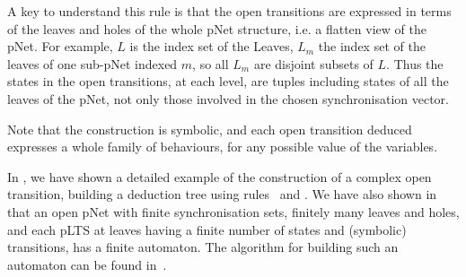 \documentclass{elsarticle}
\newcommand{\TODO}[1]{\textcolor{red}{\textbf{[TODO:#1]}}}
\begin{document}
\begin{definition}
	\medskip
\end{definition}
        	A key to understand this rule is that the open transitions are
	expressed in terms of the leaves and holes of the whole pNet structure,
	i.e. a flatten view of the pNet. For example, $L$ is the index set of the
	Leaves, $L_m$ the index set of the leaves of one sub-pNet indexed $m$, so all $L_m$
	are disjoint subsets of $L$. Thus the states in the open transitions,
	at each level, are tuples including states of all the
	leaves of the pNet, not only those involved in the chosen
	synchronisation vector.


Note that  the construction is symbolic, and each open transition deduced expresses a whole family of
behaviours, for any possible value of the variables.
%

In \cite{henrio:Forte2016}, we have  shown a detailed example of the construction of a complex open transition, building a deduction tree using rules \TrUn ~and \TrDeux.
We have also shown in \cite{henrio:Forte2016} that an open pNet
with finite synchronisation sets, finitely many leaves and
holes, and each pLTS at leaves having a finite number of states and
(symbolic) transitions, has a finite automaton. The algorithm for building such an automaton can be found in~\cite{QBMZ-AVOCS18}.


\end{document}
